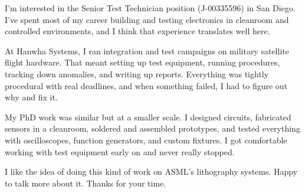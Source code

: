 \documentclass[letterpaper,11pt]{moderncv}
\date{\today}
\begin{document}
\makelettertitle

I'm interested in the Senior Test Technician position (J-00335596) in San Diego. I've spent most of my career building and testing electronics in cleanroom and controlled environments, and I think that experience translates well here.

At Hanwha Systems, I ran integration and test campaigns on military satellite flight hardware. That meant setting up test equipment, running procedures, tracking down anomalies, and writing up reports. Everything was tightly procedural with real deadlines, and when something failed, I had to figure out why and fix it.

My PhD work was similar but at a smaller scale. I designed circuits, fabricated sensors in a cleanroom, soldered and assembled prototypes, and tested everything with oscilloscopes, function generators, and custom fixtures. I got comfortable working with test equipment early on and never really stopped.

I like the idea of doing this kind of work on ASML's lithography systems. Happy to talk more about it. Thanks for your time.

\makeletterclosing
\end{document}
